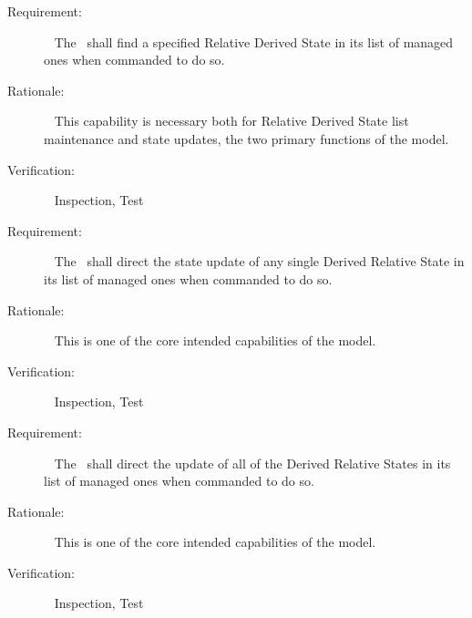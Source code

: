 \label{reqt:func_find_relstate}
\begin{description}
  \item[Requirement:]\ \newline
    The \relkinDesc\ shall find a specified Relative Derived State in its
    list of managed ones when commanded to do so.

  \item[Rationale:]\ \newline
    This capability is necessary both for Relative Derived State list
    maintenance and state updates, the two primary functions of the model.

  \item[Verification:]\ \newline
    Inspection, Test
\end{description}

\label{reqt:func_update_single}
\begin{description}
  \item[Requirement:]\ \newline
    The \relkinDesc\ shall direct the state update of any single Derived
    Relative State in its list of managed ones when commanded to do so.

  \item[Rationale:]\ \newline
    This is one of the core intended capabilities of the model.

  \item[Verification:]\ \newline
    Inspection, Test
\end{description}

\label{reqt:func_update_all}
\begin{description}
  \item[Requirement:]\ \newline
    The \relkinDesc\ shall direct the update of all of the Derived Relative
    States in its list of managed ones when commanded to do so.

  \item[Rationale:]\ \newline
    This is one of the core intended capabilities of the model.

  \item[Verification:]\ \newline
    Inspection, Test
\end{description}

